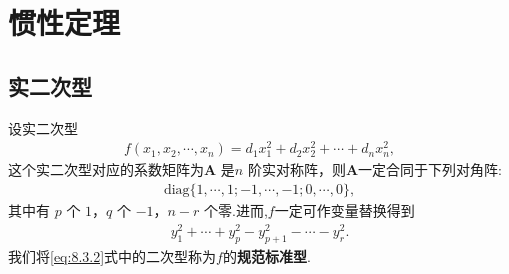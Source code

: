 \documentclass[../../main.tex]{subfiles}
\begin{document}
\section{惯性定理}

\subsection{实二次型}

\begin{theorem}[实二次型的规范标准型]\label{theorem:实二次型的规范标准型}
设实二次型
\begin{align*}
f(x_1,x_2,\cdots,x_n)=d_1x_1^2 + d_2x_2^2 + \cdots + d_nx_n^2,
\end{align*}
这个实二次型对应的系数矩阵为$\boldsymbol{A}$ 是$n$ 阶实对称阵，则$\boldsymbol{A}$一定合同于下列对角阵:
\begin{align}
\mathrm{diag}\{1,\cdots,1;-1,\cdots,-1;0,\cdots,0\},\label{eq:8.3.3}
\end{align}
其中有 $p$ 个 $1$，$q$ 个 $-1$，$n - r$ 个零.进而,$f$一定可作变量替换得到
\begin{align}
y_1^2 + \cdots + y_p^2 - y_{p + 1}^2 - \cdots - y_r^2.\label{eq:8.3.2}
\end{align}
我们将\eqref{eq:8.3.2}式中的二次型称为$f$的\textbf{规范标准型}.
\end{theorem}
\end{document}
